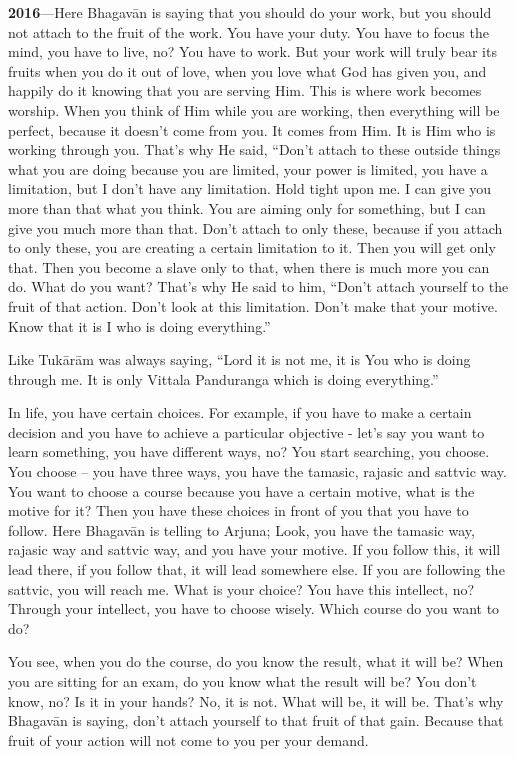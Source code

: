 \textbf{2016}---Here Bhagavān is saying that you should do your work, but you should not attach to the fruit of the work. You have your duty. You have to focus the mind, you have to live, no? You have to work. But your work will truly bear its fruits when you do it out of love, when you love what God has given you, and happily do it knowing that you are serving Him. This is where work becomes worship. When you think of Him while you are working, then everything will be perfect, because it doesn’t come from you. It comes from Him. It is Him who is working through you. That’s why He said, “Don’t attach to these outside things what you are doing because you are limited, your power is limited, you have a limitation, but I don’t have any limitation. Hold tight upon me. I can give you more than that what you think. You are aiming only for something, but I can give you much more than that. Don’t attach to only these, because if you attach to only these, you are creating a certain limitation to it. Then you will get only that. Then you become a slave only to that, when there is much more you can do. What do you want? That's why He said to him, “Don’t attach yourself to the fruit of that action. Don’t look at this limitation. Don’t make that your motive. Know that it is I who is doing everything.”

Like Tukārām was always saying, “Lord it is not me, it is You who is doing through me. It is only Vittala Panduranga which is doing everything.”

In life, you have certain choices. For example, if you have to make a certain decision and you have to achieve a particular objective - let’s say you want to learn something, you have different ways, no? You start searching, you choose. You choose – you have three ways, you have the tamasic, rajasic and sattvic way. You want to choose a course because you have a certain motive, what is the motive for it? Then you have these choices in front of you that you have to follow. Here Bhagavān is telling to Arjuna; Look, you have the tamasic way, rajasic way and sattvic way, and you have your motive. If you follow this, it will lead there, if you follow that, it will lead somewhere else. If you are following the sattvic, you will reach me. What is your choice? You have this intellect, no? Through your intellect, you have to choose wisely. Which course do you want to do?

You see, when you do the course, do you know the result, what it will be? When you are sitting for an exam, do you know what the result will be? You don’t know, no? Is it in your hands? No, it is not. What will be, it will be. That’s why Bhagavān is saying, don’t attach yourself to that fruit of that gain. Because that fruit of your action will not come to you per your demand.

